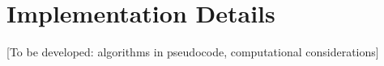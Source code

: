 \chapter{Implementation Details}

[To be developed: algorithms in pseudocode, computational considerations]